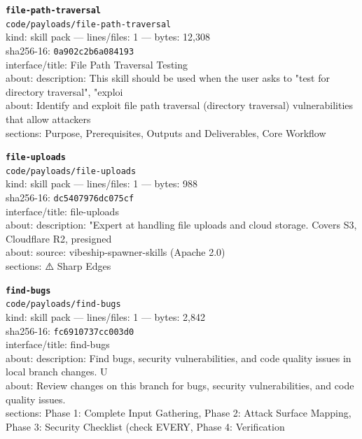 \noindent\textbf{\texttt{file-path-traversal}}\\
\texttt{code/payloads/file-path-traversal}\\
kind: skill pack --- lines/files: 1 --- bytes: 12,308\\
sha256-16: \texttt{0a902c2b6a084193}\\
interface/title: File Path Traversal Testing\\
about: description: This skill should be used when the user asks to "test for directory traversal", "exploi\\
about: Identify and exploit file path traversal (directory traversal) vulnerabilities that allow attackers \\
sections: Purpose, Prerequisites, Outputs and Deliverables, Core Workflow\\
\vspace*{6.0pt}

\noindent\textbf{\texttt{file-uploads}}\\
\texttt{code/payloads/file-uploads}\\
kind: skill pack --- lines/files: 1 --- bytes: 988\\
sha256-16: \texttt{dc5407976dc075cf}\\
interface/title: file-uploads\\
about: description: "Expert at handling file uploads and cloud storage. Covers S3, Cloudflare R2, presigned\\
about: source: vibeship-spawner-skills (Apache 2.0)\\
sections: ⚠️ Sharp Edges\\
\vspace*{6.0pt}

\noindent\textbf{\texttt{find-bugs}}\\
\texttt{code/payloads/find-bugs}\\
kind: skill pack --- lines/files: 1 --- bytes: 2,842\\
sha256-16: \texttt{fc6910737cc003d0}\\
interface/title: find-bugs\\
about: description: Find bugs, security vulnerabilities, and code quality issues in local branch changes. U\\
about: Review changes on this branch for bugs, security vulnerabilities, and code quality issues.\\
sections: Phase 1: Complete Input Gathering, Phase 2: Attack Surface Mapping, Phase 3: Security Checklist (check EVERY, Phase 4: Verification\\
\vspace*{6.0pt}
\newpage


